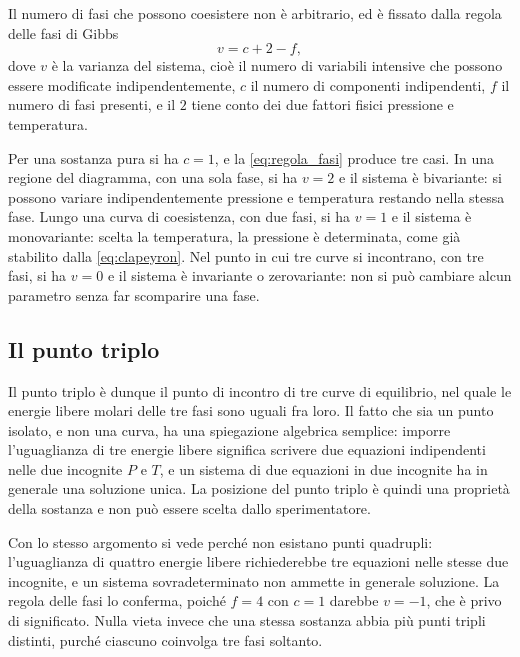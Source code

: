 Il numero di fasi che possono coesistere non è arbitrario, ed è fissato dalla regola delle fasi di Gibbs
\begin{equation}
    v = c + 2 - f ,
    \label{eq:regola_fasi}
\end{equation}
dove $v$ è la varianza del sistema, cioè il numero di variabili intensive che possono essere modificate indipendentemente, $c$ il numero di componenti indipendenti, $f$ il numero di fasi presenti, e il $2$ tiene conto dei due fattori fisici pressione e temperatura.
 
Per una sostanza pura si ha $c = 1$, e la \eqref{eq:regola_fasi} produce tre casi.
In una regione del diagramma, con una sola fase, si ha $v = 2$ e il sistema è bivariante: si possono variare indipendentemente pressione e temperatura restando nella stessa fase.
Lungo una curva di coesistenza, con due fasi, si ha $v = 1$ e il sistema è monovariante: scelta la temperatura, la pressione è determinata, come già stabilito dalla \eqref{eq:clapeyron}.
Nel punto in cui tre curve si incontrano, con tre fasi, si ha $v = 0$ e il sistema è invariante o zerovariante: non si può cambiare alcun parametro senza far scomparire una fase.
 
\subsection{Il punto triplo}
 
Il punto triplo è dunque il punto di incontro di tre curve di equilibrio, nel quale le energie libere molari delle tre fasi sono uguali fra loro.
Il fatto che sia un punto isolato, e non una curva, ha una spiegazione algebrica semplice: imporre l'uguaglianza di tre energie libere significa scrivere due equazioni indipendenti nelle due incognite $P$ e $T$, e un sistema di due equazioni in due incognite ha in generale una soluzione unica.
La posizione del punto triplo è quindi una proprietà della sostanza e non può essere scelta dallo sperimentatore.
 
Con lo stesso argomento si vede perché non esistano punti quadrupli: l'uguaglianza di quattro energie libere richiederebbe tre equazioni nelle stesse due incognite, e un sistema sovradeterminato non ammette in generale soluzione.
La regola delle fasi lo conferma, poiché $f = 4$ con $c = 1$ darebbe $v = -1$, che è privo di significato.
Nulla vieta invece che una stessa sostanza abbia più punti tripli distinti, purché ciascuno coinvolga tre fasi soltanto.
 
